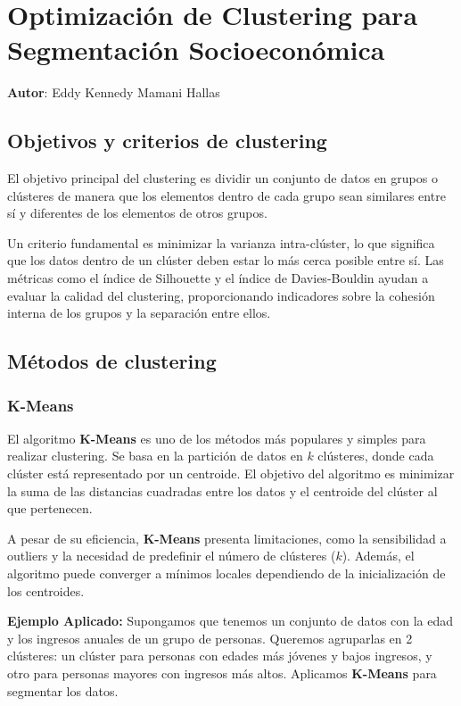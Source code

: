 \documentclass[12pt]{book}
\begin{document}
	\chapter{Optimización de Clustering para Segmentación Socioeconómica}
	\label{chap:10}
	\textbf{Autor}: \large{Eddy Kennedy Mamani Hallas}
	\section{Objetivos y criterios de clustering}
	El objetivo principal del clustering es dividir un conjunto de datos en grupos o clústeres de manera que los elementos dentro de cada grupo sean similares entre sí y diferentes de los elementos de otros grupos. 
	
	Un criterio fundamental es minimizar la varianza intra-clúster, lo que significa que los datos dentro de un clúster deben estar lo más cerca posible entre sí. Las métricas como el índice de Silhouette y el índice de Davies-Bouldin ayudan a evaluar la calidad del clustering, proporcionando indicadores sobre la cohesión interna de los grupos y la separación entre ellos.
	
	\section{Métodos de clustering}
	\subsection{K-Means}
	El algoritmo \textbf{K-Means} es uno de los métodos más populares y simples para realizar clustering. Se basa en la partición de datos en $k$ clústeres, donde cada clúster está representado por un centroide. El objetivo del algoritmo es minimizar la suma de las distancias cuadradas entre los datos y el centroide del clúster al que pertenecen.
	
	A pesar de su eficiencia, \textbf{K-Means} presenta limitaciones, como la sensibilidad a outliers y la necesidad de predefinir el número de clústeres ($k$). Además, el algoritmo puede converger a mínimos locales dependiendo de la inicialización de los centroides.
	
	\textbf{Ejemplo Aplicado:}
	Supongamos que tenemos un conjunto de datos con la edad y los ingresos anuales de un grupo de personas. Queremos agruparlas en 2 clústeres: un clúster para personas con edades más jóvenes y bajos ingresos, y otro para personas mayores con ingresos más altos. Aplicamos \textbf{K-Means} para segmentar los datos.
	
\end{document}
